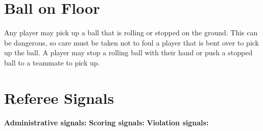 \section{Ball on Floor}
Any player may pick up a ball that is rolling or stopped on the ground. This can be dangerous, so care must be taken not to
foul a player that is bent over to pick up the ball. A player may stop a rolling ball with their hand or push a stopped ball to
a teammate to pick up.
\section{Referee Signals}
\textbf{Administrative signals:}
\textbf{Scoring signals:}
\textbf{Violation signals:}

